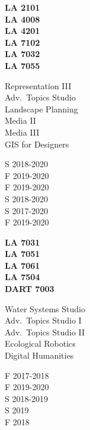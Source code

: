 \documentclass[]{baharmon-cv}
\begin{document}
\begin{minipage}[t]{0.1\textwidth} 
\textbf{LA 2101}\\
\textbf{LA 4008}\\
\textbf{LA 4201}\\
\textbf{LA 7102}\\
\textbf{LA 7032}\\
\textbf{LA 7055}\\
\end{minipage}
\begin{minipage}[t]{0.2\textwidth} 
Representation III\\
Adv.~Topics Studio\\
Landscape Planning \\
Media II \\
Media III\\
GIS for Designers\\
\end{minipage}
\begin{minipage}[t]{0.2\textwidth} 
S 2018-2020\\
F 2019-2020\\
F 2019-2020\\
S 2018-2020\\
S 2017-2020\\
F 2019-2020\\
\end{minipage}
\begin{minipage}[t]{0.15\textwidth} 
\textbf{LA 7031}\\
\textbf{LA 7051}\\
\textbf{LA 7061}\\
\textbf{LA 7504}\\
\textbf{DART 7003}\\
\end{minipage}
\begin{minipage}[t]{0.2\textwidth} 
Water Systems Studio\\
Adv.~Topics Studio I\\
Adv.~Topics Studio II\\
Ecological Robotics\\
Digital Humanities\\
\end{minipage}
\begin{minipage}[t]{0.15\textwidth} 
F 2017-2018\\
F 2019-2020\\
S 2018-2019\\
S 2019\\
F 2018\\
\end{minipage}
\end{document}
